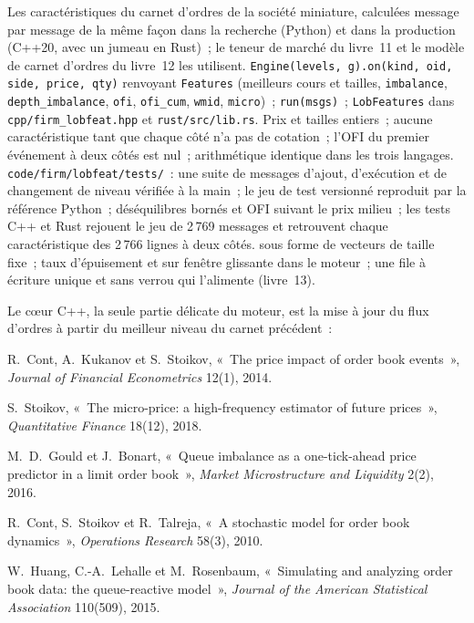 \begin{build}
 Les caractéristiques du carnet d'ordres de la société miniature, calculées message par message de la même façon dans la recherche (Python) et dans
la production (C++20, avec un jumeau en Rust)~; le teneur de marché du livre~11 et le modèle de carnet d'ordres du livre~12 les utilisent.
 \texttt{Engine(levels, g).on(kind, oid, side, price, qty)} renvoyant \texttt{Features} (meilleurs cours et tailles,
\texttt{imbalance}, \texttt{depth\_imbalance}, \texttt{ofi}, \texttt{ofi\_cum}, \texttt{wmid}, \texttt{micro})~; \texttt{run(msgs)}~;
\texttt{LobFeatures} dans \texttt{cpp/firm\_lobfeat.hpp} et \texttt{rust/src/lib.rs}.
 Prix et tailles entiers~; aucune caractéristique tant que chaque côté n'a pas de cotation~; l'OFI du premier événement à deux côtés est nul~; arithmétique identique
dans les trois langages.
 \texttt{code/firm/lobfeat/tests/}~: une suite de messages d'ajout, d'exécution et de changement de niveau vérifiée à la main~; le jeu de test versionné
reproduit par la référence Python~; déséquilibres bornés et OFI suivant le prix milieu~; les tests C++ et Rust rejouent le jeu de 2\,769 messages
et retrouvent chaque caractéristique des 2\,766 lignes à deux côtés.
  sous forme de vecteurs de taille fixe~; taux d'épuisement et  sur fenêtre glissante dans le moteur~; une file
à écriture unique et sans verrou qui l'alimente (livre~13).
\end{build}

Le cœur C++, la seule partie délicate du moteur, est la mise à jour du flux d'ordres à partir du meilleur niveau du carnet précédent~:

\label{lst:rs:order-book-features:cpp}

\begin{omsources}
\item R.~Cont, A.~Kukanov et S.~Stoikov, «~The price impact of order book events~», \emph{Journal of Financial Econometrics} 12(1), 2014.
\item S.~Stoikov, «~The micro-price: a high-frequency estimator of future prices~», \emph{Quantitative Finance} 18(12), 2018.
\item M.~D.~Gould et J.~Bonart, «~Queue imbalance as a one-tick-ahead price predictor in a limit order book~», \emph{Market Microstructure
and Liquidity} 2(2), 2016.
\item R.~Cont, S.~Stoikov et R.~Talreja, «~A stochastic model for order book dynamics~», \emph{Operations Research} 58(3), 2010.
\item W.~Huang, C.-A.~Lehalle et M.~Rosenbaum, «~Simulating and analyzing order book data: the queue-reactive model~», \emph{Journal of the
American Statistical Association} 110(509), 2015.
\end{omsources}

